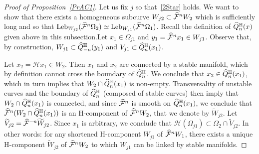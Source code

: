 \documentclass[AHL, Unicode, longabstracts,published]{cedram}
\newcommand{\cm}{\mathcal{F}}
\newcommand{\hol}{\mathcal{H}}
\newcommand{\cmp}{\hat\cm}
\newcommand{\tV}{\widetilde{V}}
\newcommand{\tW}{\widetilde{W}}
\newcommand{\cch}{\hat Q^{\mathbb{H}}}
\newcommand{\Leb}{\textup{Leb}}
\let\oldhat\hat
\renewcommand*{\hat}[1]{\mathchoice{\widehat{#1}}{\widehat{#1}}{\oldhat{#1}}{\oldhat{#1}}}
\begin{document}
\begin{proof}[Proof of Proposition~\ref{PrAC1}]
Let us fix $j$ so that~\eqref{2Star} holds. We want to show that there exists a homogeneous subcurve $W_{j2}\subset \cmp^n W_2$ which is sufficiently long and so that $\Leb_{W_{j2}}(\cmp^{n}\Omega_{2}) \simeq
\Leb_{W_{j1}}(\cmp^{n}\Omega_{1})$. Recall the definition of $\cch_n(x)$ given above in this subsection.\linebreak Let $x_{1}\in \Omega_{j1}$ and $y_{1} = \cmp^{n}x_{1}\in W_{j1}$. Observe that, by construction, $W_{j1}\subset \cch_{-n}(y_{1})$ and $V_{j1}\subset \cch_{n}(x_{1})$.


Let $x_{2} = \hol x_{1}\in W_{2}$. Then $x_{1}$ and $x_{2}$ are connected by a stable manifold, which by definition cannot cross the boundary of $\cch_{n}$. We conclude that $x_{2}\in \cch_{n}(x_{1})$, which in turn implies that $W_{2}\cap \cch_{n}(x_{1})$ is non-empty. Transversality of unstable curves and the boundary of $\cch_{n}$ (composed of stable curves) then imply that $W_{2}\cap \cch_{n}(x_{1})$ is connected, and since $\cmp^{n}$ is smooth on $\cch_{n}(x_{1})$, we conclude that $\cmp^{n}(W_{2}\cap \cch_{n}(x_{1}))$ is an H-component of $\cmp^{n}W_{2}$, that we denote by $\tW_{j2}$. Let $\tV_{j2} = \cmp^{-n}\tW_{j2}$. Since $x_{1}$ is arbitrary, we conclude that $\hol(\Omega_{j1}) \subset \Omega_{2}\cap \tV_{j2}$. In other words: for any shortened H-component $W_{j1}$ of $\cmp^{n}W_{1}$, there exists a unique H-component $\tW_{j2}$ of $\cmp^{n}W_{2}$ to which $W_{j1}$ can be linked by stable manifolds.


\end{proof}
\end{document}
